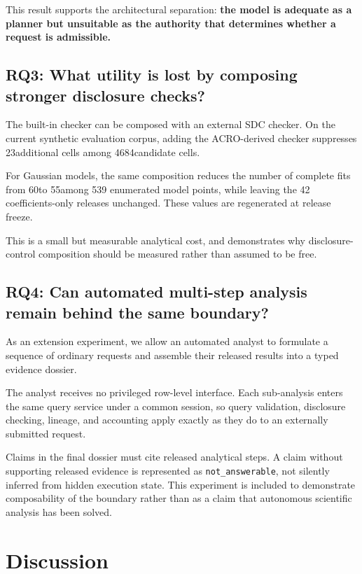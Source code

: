\documentclass[11pt,a4paper]{article}
\newcommand{\CompositeCells}{4684}
\newcommand{\CompositeExtraSuppressed}{23}
\newcommand{\CompositeModelPoints}{539}
\newcommand{\CompositeFullBase}{60}
\newcommand{\CompositeFullStrong}{55}
\newcommand{\CompositeCoeffOnly}{42}
\begin{document}
This result supports the architectural separation: \textbf{the model is
adequate as a planner but unsuitable as the authority that determines whether a
request is admissible.}

\subsection{RQ3: What utility is lost by composing stronger disclosure checks?}
\label{sec:acro-eval}

The built-in checker can be composed with an external SDC checker. On the
current synthetic evaluation corpus, adding the ACRO-derived checker suppresses
\CompositeExtraSuppressed additional cells among \CompositeCells candidate
cells.

For Gaussian models, the same composition reduces the number of complete fits
from \CompositeFullBase to \CompositeFullStrong among \CompositeModelPoints
enumerated model points, while leaving the \CompositeCoeffOnly
coefficients-only releases unchanged. These values are regenerated at release
freeze.

This is a small but measurable analytical cost, and demonstrates why
disclosure-control composition should be measured rather than assumed to be
free.

\subsection{RQ4: Can automated multi-step analysis remain behind the same boundary?}
\label{sec:inside-analyst}

As an extension experiment, we allow an automated analyst to formulate a
sequence of ordinary requests and assemble their released results into a typed
evidence dossier.

The analyst receives no privileged row-level interface. Each sub-analysis enters
the same query service under a common session, so query validation, disclosure
checking, lineage, and accounting apply exactly as they do to an externally
submitted request.

Claims in the final dossier must cite released analytical steps. A claim without
supporting released evidence is represented as \texttt{not\_answerable}, not
silently inferred from hidden execution state. This experiment is included to
demonstrate composability of the boundary rather than as a claim that
autonomous scientific analysis has been solved.

\section{Discussion}
\label{sec:discussion}
\end{document}
